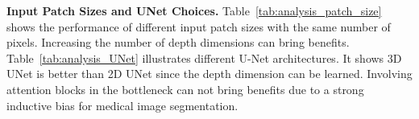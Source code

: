 \begin{table}
    \vspace{-0.2cm}
    \centering
    \caption{Experiments for different UNet models on BTCV dataset.}
    \label{tab:analysis_UNet}
    \vspace{-0.6cm}
\end{table}

\noindent \textbf{Input Patch Sizes and UNet Choices.} Table~\ref{tab:analysis_patch_size} shows the performance of different input patch sizes with the same number of pixels. Increasing the number of depth dimensions can bring benefits. Table~\ref{tab:analysis_UNet} illustrates different U-Net architectures. It shows 3D UNet is better than 2D UNet since the depth dimension can be learned. Involving attention blocks in the bottleneck can not bring benefits due to a strong inductive bias for medical image segmentation.












